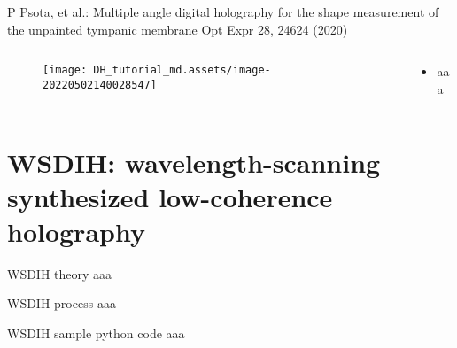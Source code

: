 \documentclass[t, aspectratio=169]{beamer}
\begin{document}
\begin{frame}{P Psota, et al.: Multiple angle digital holography for the shape measurement of the unpainted tympanic membrane}
	\vspace{-3 mm}
	\small Opt Expr  28, 24624 (2020)
	\begin{columns}
		\begin{column}{.6\textwidth}
			\begin{figure}
				\texttt{[image: DH\_tutorial\_md.assets/image-20220502140028547]}
			\end{figure}
		\end{column}
		\begin{column}{.4\textwidth}
			\begin{itemize}
				\item aaa
			\end{itemize}
		\end{column}
	\end{columns}
\end{frame}




\section{WSDIH: wavelength-scanning synthesized low-coherence holography}
\begin{frame}[c]
	\centering\LARGE\textbf{\secname}
\end{frame}


\begin{frame}{WSDIH theory}
aaa
\end{frame}


\begin{frame}{WSDIH process}
aaa
\end{frame}


\begin{frame}{WSDIH sample python code}
aaa
\end{frame}
\end{document}

